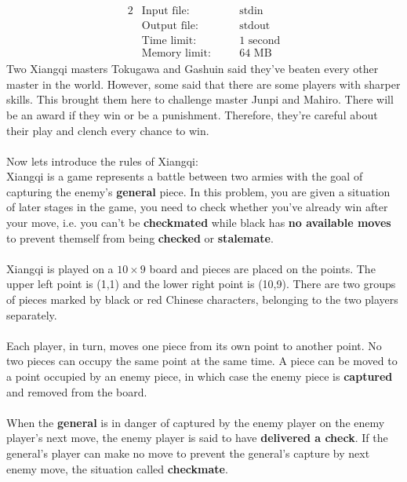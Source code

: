 \documentclass[12pt,a4paper]{article}
\begin{document}
\begin{alignat*} {2}
 &   \text{Input file:}   \quad     &&\text{stdin}\\
 &   \text{Output file:}  \quad     &&\text{stdout}\\
 &   \text{Time limit:}   \quad     &&\text{1 second}\\
 &   \text{Memory limit:} \quad     &&\text{64 MB}
\end{alignat*}
\noindent
Two Xiangqi masters Tokugawa and Gashuin said they've beaten every other master in the world. However, some said that there
are some players with sharper skills. This brought them here
to challenge master Junpi and Mahiro. There will be an award if they win or be a punishment.
Therefore, they're careful about their play and clench every chance to win.
\\\\
\noindent
Now let\textquotesingle s introduce the rules of Xiangqi:
\\\noindent
Xiangqi is a game represents a battle between two armies with the goal
of capturing the enemy's \textbf{general} piece. In this problem, you are
given a situation of later stages in the game, you need to check
whether you've already win after your move, i.e. you can't be \textbf{checkmated} while black has \textbf{no available moves} to prevent themself from being \textbf{checked} or \textbf{stalemate}.
\\\\
\noindent
Xiangqi is played on a $10\times9$ board and pieces are
placed on the points. The upper left point is (1,1) and
the lower right point is (10,9). There are two groups of pieces marked
by black or red Chinese characters, belonging to the two players
separately.
\\\\
\noindent
Each player, in turn, moves one piece from its own point to another point. No two pieces can occupy the
same point at the same time. A piece can be moved to a point occupied
by an enemy piece, in which case the enemy piece is \textbf{captured} and
removed from the board. 
\\\\
\noindent
When the \textbf{general} is in danger of captured
by the enemy player on the enemy player's next move, the enemy player is
said to have \textbf{delivered a check}. If the general's player can make no
move to prevent the general's capture by next enemy move, the situation called \textbf{checkmate}.
\\\\
\end{document}
